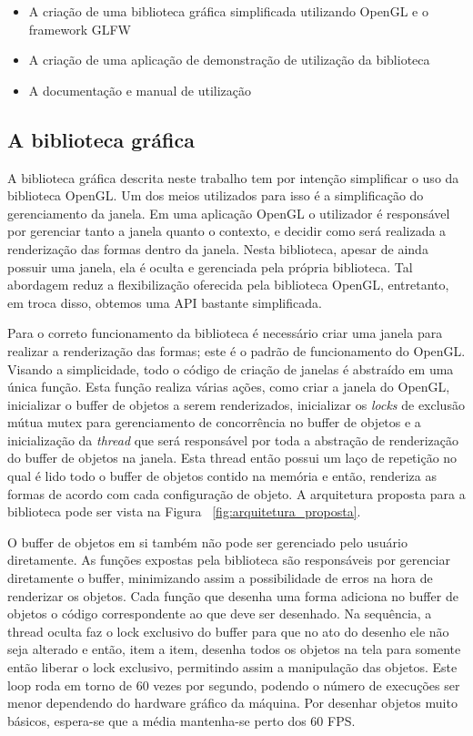 \documentclass[12pt, %
openright,
oneside, %
a4paper,    %
brazil]{facom-ufu-abntex2}
\begin{document}
\begin{itemize}
    \item A criação de uma biblioteca gráfica simplificada utilizando OpenGL e o framework GLFW
    \item A criação de uma aplicação de demonstração de utilização da biblioteca
    \item A documentação e manual de utilização
\end{itemize}

\subsection{A biblioteca gráfica}
A biblioteca gráfica descrita neste trabalho tem por intenção simplificar o uso da biblioteca OpenGL. Um dos meios utilizados para isso é a simplificação do gerenciamento da janela. Em uma aplicação OpenGL o utilizador é responsável por gerenciar tanto a janela quanto o contexto, e decidir como será realizada a renderização das formas dentro da janela. Nesta biblioteca, apesar de ainda possuir uma janela, ela é oculta e gerenciada pela própria biblioteca. Tal abordagem reduz a flexibilização oferecida pela biblioteca OpenGL, entretanto, em troca disso, obtemos uma API bastante simplificada.

Para o correto funcionamento da biblioteca é necessário criar uma janela para realizar a renderização das formas; este é o padrão de funcionamento do OpenGL. Visando a simplicidade, todo o código de criação de janelas é abstraído em uma única função. Esta função realiza várias ações, como criar a janela do OpenGL, inicializar o buffer de objetos a serem renderizados, inicializar os \textit{locks} de exclusão mútua mutex para gerenciamento de concorrência no buffer de objetos e a inicialização da \textit{thread} que será responsável por toda a abstração de renderização do buffer de objetos na janela. Esta thread então possui um laço de repetição no qual é lido todo o buffer de objetos contido na memória e então, renderiza as formas de acordo com cada configuração de objeto. A arquitetura proposta para a biblioteca pode ser vista na Figura ~\ref{fig:arquitetura_proposta}.

O buffer de objetos em si também não pode ser gerenciado pelo usuário diretamente. As funções expostas pela biblioteca são responsáveis por gerenciar diretamente o buffer, minimizando assim a possibilidade de erros na hora de renderizar os objetos. Cada função que desenha uma forma adiciona no buffer de objetos o código correspondente ao que deve ser desenhado. Na sequência, a thread oculta faz o lock exclusivo do buffer para que no ato do desenho ele não seja alterado e então, item a item, desenha todos os objetos na tela para somente então liberar o lock exclusivo, permitindo assim a manipulação das objetos. Este loop roda em torno de 60 vezes por segundo, podendo o número de execuções ser menor dependendo do hardware gráfico da máquina. Por desenhar objetos muito básicos, espera-se que a média mantenha-se perto dos 60 FPS.
\end{document}
